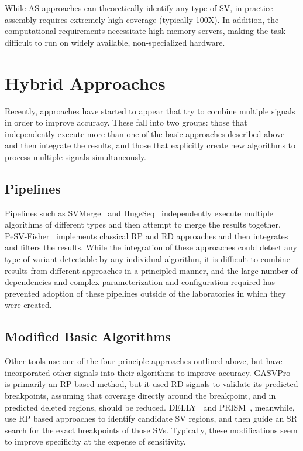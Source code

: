 While AS approaches can theoretically identify any type of SV, in practice assembly requires extremely high coverage (typically 100X). In addition, the computational requirements necessitate high-memory servers, making the task difficult to run on widely available, non-specialized hardware.

\section{Hybrid Approaches}

Recently, approaches have started to appear that try to combine multiple signals in order to improve accuracy. These fall into two groups: those that independently execute more than one of the basic approaches described above and then integrate the results, and those that explicitly create new algorithms to process multiple signals simultaneously.

\subsection{Pipelines}

Pipelines such as SVMerge~\cite{Wong:2010p1271} and HugeSeq~\cite{Lam:2012jy} independently execute multiple algorithms of different types and then attempt to merge the results together. PeSV-Fisher~\cite{Escaramis:2013dm} implements classical RP and RD approaches and then integrates and filters the results. While the integration of these approaches could detect any type of variant detectable by any individual algorithm, it is difficult to combine results from different approaches in a principled manner, and the large number of dependencies and complex parameterization and configuration required has prevented adoption of these pipelines outside of the laboratories in which they were created.

\subsection{Modified Basic Algorithms}

Other tools use one of the four principle approaches outlined above, but have incorporated other signals into their algorithms to improve accuracy. GASVPro~\cite{Sindi:2012kk} is primarily an RP based method, but it used RD signals to validate its predicted breakpoints, assuming that coverage directly around the breakpoint, and in predicted deleted regions, should be reduced. DELLY~\cite{Rausch:2012he} and PRISM~\cite{Jiang:2012cp}, meanwhile, use RP based approaches to identify candidate SV regions, and then guide an SR search for the exact breakpoints of those SVs. Typically, these modifications seem to improve specificity at the expense of sensitivity.


